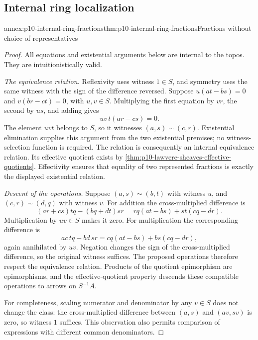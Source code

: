 \subsection{Internal ring localization}
\label{sec:annex-p10-internal-ring-fractions}

\begin{annexitem}{annex:p10-internal-ring-fractions}{thm:p10-internal-ring-fractions}{Fractions without choice of representatives}
\begin{proof}
All equations and existential arguments below are internal to the topos.
They are intuitionistically valid.

\emph{The equivalence relation.}
Reflexivity uses witness \(1\in S\), and symmetry uses the same
witness with the sign of the difference reversed.
Suppose \(u(at-bs)=0\) and \(v(br-ct)=0\), with \(u,v\in S\).
Multiplying the first equation by \(vr\), the second by \(us\),
and adding gives
\[
 uv\,t(ar-cs)=0.
\]
The element \(uvt\) belongs to \(S\), so it witnesses
\((a,s)\sim(c,r)\).
Existential elimination supplies this argument from the two
existential premises; no witness-selection function is required.
The relation is consequently an internal equivalence relation.
Its effective quotient exists by
\cref{thm:p10-lawvere-sheaves-effective-quotients}.
Effectivity ensures that equality of two represented fractions is
exactly the displayed existential relation.

\emph{Descent of the operations.}
Suppose \((a,s)\sim(b,t)\) with witness \(u\), and
\((c,r)\sim(d,q)\) with witness \(v\).
For addition the cross-multiplied difference is
\[
 (ar+cs)tq-(bq+dt)sr
 =rq(at-bs)+st(cq-dr).
\]
Multiplication by \(uv\in S\) makes it zero.
For multiplication the corresponding difference is
\[
 ac\,tq-bd\,sr=cq(at-bs)+bs(cq-dr),
\]
again annihilated by \(uv\).
Negation changes the sign of the cross-multiplied difference,
so the original witness suffices.
The proposed operations therefore respect the equivalence relation.
Products of the quotient epimorphism are epimorphisms, and the
effective-quotient property descends these compatible operations
to arrows on \(S^{-1}A\).

For completeness, scaling numerator and denominator by any
\(v\in S\) does not change the class: the cross-multiplied
difference between \((a,s)\) and \((av,sv)\) is zero, so
witness \(1\) suffices. This observation also permits comparison
of expressions with different common denominators.


\end{proof}
\end{annexitem}
